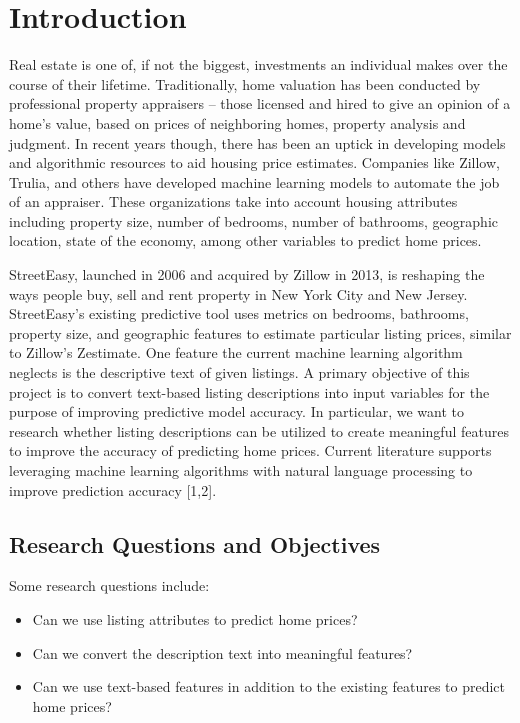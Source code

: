\documentclass[10pt,letterpaper]{article}
\providecommand{\tightlist}{%
  \setlength{\itemsep}{0pt}\setlength{\parskip}{0pt}}
\begin{document}
\linenumbers

\hypertarget{introduction}{%
\section{Introduction}\label{introduction}}

Real estate is one of, if not the biggest, investments an individual
makes over the course of their lifetime. Traditionally, home valuation
has been conducted by professional property appraisers -- those licensed
and hired to give an opinion of a home's value, based on prices of
neighboring homes, property analysis and judgment. In recent years
though, there has been an uptick in developing models and algorithmic
resources to aid housing price estimates. Companies like Zillow, Trulia,
and others have developed machine learning models to automate the job of
an appraiser. These organizations take into account housing attributes
including property size, number of bedrooms, number of bathrooms,
geographic location, state of the economy, among other variables to
predict home prices.

StreetEasy, launched in 2006 and acquired by Zillow in 2013, is
reshaping the ways people buy, sell and rent property in New York City
and New Jersey. StreetEasy's existing predictive tool uses metrics on
bedrooms, bathrooms, property size, and geographic features to estimate
particular listing prices, similar to Zillow's Zestimate. One feature
the current machine learning algorithm neglects is the descriptive text
of given listings. A primary objective of this project is to convert
text-based listing descriptions into input variables for the purpose of
improving predictive model accuracy. In particular, we want to research
whether listing descriptions can be utilized to create meaningful
features to improve the accuracy of predicting home prices. Current
literature supports leveraging machine learning algorithms with natural
language processing to improve prediction accuracy {[}1,2{]}.

\hypertarget{research-questions-and-objectives}{%
\subsection{Research Questions and
Objectives}\label{research-questions-and-objectives}}

Some research questions include:

\begin{itemize}
\tightlist
\item
  Can we use listing attributes to predict home prices?
\item
  Can we convert the description text into meaningful features?
\item
  Can we use text-based features in addition to the existing features to
  predict home prices?
\end{itemize}
\end{document}
